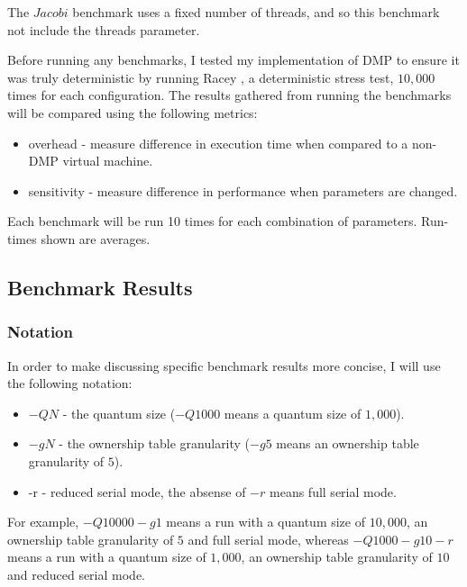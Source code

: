 The $Jacobi$ benchmark uses a fixed number of threads, and so this
benchmark not include the threads parameter.

Before running any benchmarks, I tested my implementation of DMP to
ensure it was truly deterministic by running Racey \cite{racey}, a
deterministic stress test, $10,000$ times for each configuration.  The
results gathered from running the benchmarks will be compared using
the following metrics:

\begin{itemize}
\item overhead - measure difference in execution time when compared to
  a non-DMP virtual machine.

\item sensitivity - measure difference in performance when parameters
  are changed.
\end{itemize}

Each benchmark will be run 10 times for each combination of
parameters.  Run-times shown are averages.

\subsection{Benchmark Results}

\subsubsection{Notation}

In order to make discussing specific benchmark results more concise, I
will use the following notation:

\begin{itemize}
\item $-QN$ - the quantum size ($-Q1000$ means a quantum size of
  $1,000$).

\item $-gN$ - the ownership table granularity ($-g5$ means an
  ownership table granularity of $5$).

\item -r - reduced serial mode, the absense of $-r$ means full serial
  mode.
\end{itemize}

For example, $-Q10000 -g1$ means a run with a quantum size of
$10,000$, an ownership table granularity of $5$ and full serial mode,
whereas $-Q1000 -g10 -r$ means a run with a quantum size of $1,000$,
an ownership table granularity of $10$ and reduced serial mode.

